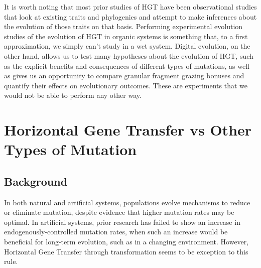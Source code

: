 \documentclass[PhD]{msu-thesis}
\begin{document}
It is worth noting that most prior studies of HGT have been observational studies that look at existing traits and phylogenies and attempt to make inferences about the evolution of those traits on that basis. Performing experimental evolution studies of the evolution of HGT in organic systems is something that, to a first approximation, we simply can't study in a wet system. Digital evolution, on the other hand, allows us to test many hypotheses about the evolution of HGT, such as the explicit benefits and consequences of different types of mutations, as well as gives us an opportunity to compare granular fragment grazing bonuses and quantify their effects on evolutionary outcomes. These are experiments that we would not be able to perform any other way.   


\chapter{Horizontal Gene Transfer vs Other Types of Mutation}
\label{chap:hgt-preferred}
\section{Background}

In both natural and artificial systems, populations evolve mechanisms to reduce or eliminate mutation\cite{wielgoss_mutation_2013}, despite evidence that higher mutation rates may be optimal\cite{clune_natural_2008}.
In artificial systems, prior research has failed to show an increase in endogenously-controlled mutation rates, when such an increase would be beneficial for long-term evolution, such as in a changing environment. However, Horizontal Gene Transfer through transformation seems to be exception to this rule.  
\end{document}
